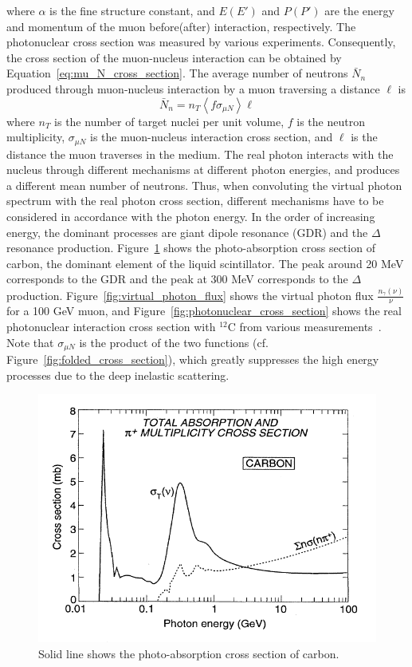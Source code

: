where $\alpha$ is the fine structure constant, and $E(E')$ and $P(P')$ are the energy and momentum of the muon before(after) interaction, respectively. The photonuclear cross section was measured by various experiments. Consequently, the cross section of the muon-nucleus interaction can be obtained by Equation~\ref{eq:mu_N_cross_section}. The average number of neutrons $\bar{N}_n$ produced through muon-nucleus interaction by a muon traversing a distance $\ell$ is
\begin{equation}
	\bar{N}_n=n_T\left\langle f\sigma_{\mu N} \right\rangle\ell
\end{equation}
where $n_T$ is the number of target nuclei per unit volume, $f$ is the neutron multiplicity, $\sigma_{\mu N}$ is the muon-nucleus interaction cross section, and $\ell$ is the distance the muon traverses in the medium. The real photon interacts with the nucleus through different mechanisms at different photon energies, and produces a different mean number of neutrons. Thus, when convoluting the virtual photon spectrum with the real photon cross section, different mechanisms have to be considered in accordance with the photon energy. In the order of increasing energy, the dominant processes are giant dipole resonance (GDR) and the $\Delta$ resonance production. Figure~\ref{fig:photo_absorption} shows the photo-absorption cross section of carbon, the dominant element of the liquid scintillator. The peak around 20 MeV corresponds to the GDR and the peak at 300 MeV corresponds to the $\Delta$ production. Figure~\ref{fig:virtual_photon_flux} shows the virtual photon flux $\frac{n_\gamma(\nu)}{\nu}$ for a 100 GeV muon, and Figure~\ref{fig:photonuclear_cross_section} shows the real photonuclear interaction cross section with $^{12}$C from various measurements~\cite{Kossov2002}. Note that $\sigma_{\mu N}$ is the product of the two functions (cf. Figure~\ref{fig:folded_cross_section}), which greatly suppresses the high energy processes due to the deep inelastic scattering.
\begin{figure}
	\centering
	\includegraphics[width=.7\textwidth]{figures/chap6/photo_abroption.png}
	\caption{Solid line shows the photo-absorption cross section of carbon.}
	\label{fig:photo_absorption}
\end{figure}
